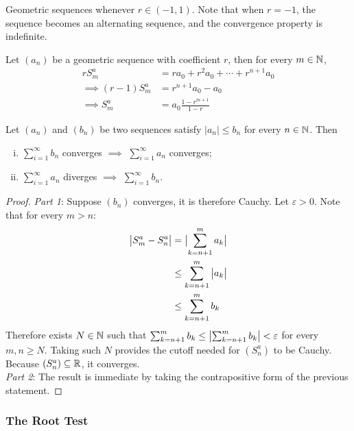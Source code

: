 \documentclass[11pt]{article}
\begin{document}
	\begin{proposition}
		Geometric sequences whenever $r \in (-1, 1)$. Note that when $r = -1$, the sequence becomes an alternating sequence, and the convergence property is indefinite.
	\end{proposition}
	
	\begin{proposition}
		Let $(a_n)$ be a geometric sequence with coefficient $r$, then for every $m \in \mathbb{N}$,
		\begin{align}
			r S^a_m &= ra_0 + r^2 a_0 + \cdots + r^{n+1} a_0 \\
			\implies (r - 1) S^a_m &= r^{n+1} a_0 - a_0 \\
			\implies S^a_m &= a_0 \frac{1 - r^{m+1}}{1 - r}
		\end{align}
	\end{proposition}
	
	\begin{theorem}
		Let $(a_n)$ and $(b_n)$ be two sequences satisfy $|a_n| \leq b_n$ for every $n \in \mathbb{N}$. Then
		\begin{enumerate}[(i)]
			\item $\sum_{i=1}^\infty b_n$ converges $\implies$ $\sum_{i=1}^\infty a_n$ converges;
			\item $\sum_{i=1}^\infty a_n$ diverges $\implies$ $\sum_{i=1}^\infty b_n$.
		\end{enumerate}
	\end{theorem}
	
	\begin{proof}
		\emph{Part 1}: Suppose $(b_n)$ converges, it is therefore Cauchy. Let $\varepsilon > 0$.
		Note that for every $m > n$:
		\begin{align}
			\big \vert {S^a_m - S^a_n} \big \vert &= \big \vert {\sum_{k=n+1}^m a_k} \big \vert \\
			&\leq \sum_{k=n+1}^m \big \vert {a_k} \big \vert \\
			&\leq \sum_{k=n+1}^m b_k
		\end{align}
		Therefore exists $N \in \mathbb{N}$ such that $\sum_{k=n+1}^m b_k \leq \big \vert {\sum_{k=n+1}^m b_k} \big \vert < \varepsilon$ for every $m, n \geq N$. Taking such $N$ provides the cutoff needed for $(S_n^a)$ to be Cauchy. Because $(S_n^a) \subseteq \mathbb{R}$, it converges. \\
		\emph{Part 2}: The result is immediate by taking the contrapositive form of the previous statement.
	\end{proof}
	
	\subsubsection{The Root Test}
	
\end{document}
